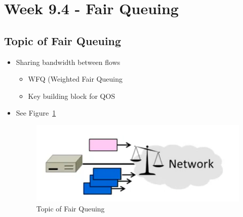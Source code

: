 \documentclass[12pt]{ctexart}   %
\begin{document}
\section{Week 9.4 - Fair Queuing}
	\subsection{Topic of Fair Queuing}
	\begin{itemize}
		\item Sharing bandwidth between flows
		\begin{itemize}
			\item WFQ (Weighted Fair Queuing
			\item Key building block for QOS
		\end{itemize}
		\item See Figure~\ref{fig:9-4-1}
		  
		 \begin{figure}[h!] %
		\centering
		 \includegraphics[scale=0.7]{images/9-4-1}
		\caption{ Topic of Fair Queuing }
		 \label{fig:9-4-1}
		 \end{figure}
	\end{itemize}
	
\end{document}
